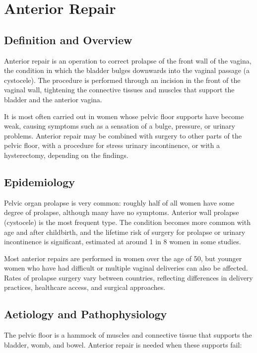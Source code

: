 \chapter{Anterior Repair}

\section*{Definition and Overview}
Anterior repair is an operation to correct prolapse of the front wall of the vagina, the condition in which the bladder bulges downwards into the vaginal passage (a cystocele). The procedure is performed through an incision in the front of the vaginal wall, tightening the connective tissues and muscles that support the bladder and the anterior vagina.

It is most often carried out in women whose pelvic floor supports have become weak, causing symptoms such as a sensation of a bulge, pressure, or urinary problems. Anterior repair may be combined with surgery to other parts of the pelvic floor, with a procedure for stress urinary incontinence, or with a hysterectomy, depending on the findings.

\section*{Epidemiology}
Pelvic organ prolapse is very common: roughly half of all women have some degree of prolapse, although many have no symptoms. Anterior wall prolapse (cystocele) is the most frequent type. The condition becomes more common with age and after childbirth, and the lifetime risk of surgery for prolapse or urinary incontinence is significant, estimated at around 1 in 8 women in some studies.

Most anterior repairs are performed in women over the age of 50, but younger women who have had difficult or multiple vaginal deliveries can also be affected. Rates of prolapse surgery vary between countries, reflecting differences in delivery practices, healthcare access, and surgical approaches.

\section*{Aetiology and Pathophysiology}
The pelvic floor is a hammock of muscles and connective tissue that supports the bladder, womb, and bowel. Anterior repair is needed when these supports fail:

